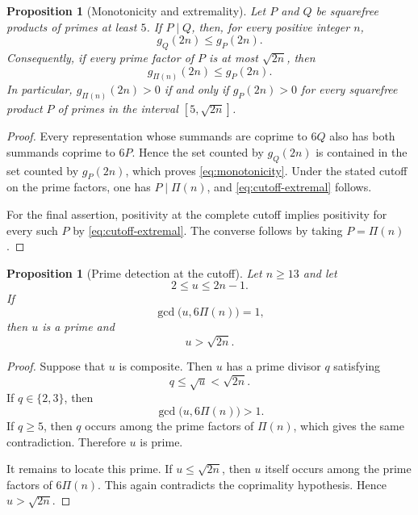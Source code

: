 \documentclass[12pt]{article}
\numberwithin{equation}{section}
\newtheorem{proposition}[theorem]{Proposition}
\theoremstyle{definition}
\theoremstyle{remark}
\begin{document}
\begin{proposition}[Monotonicity and extremality]
\label{prop:cutoff-monotonicity}
Let $P$ and $Q$ be squarefree products of primes at least $5$.
If $P\mid Q$, then, for every positive integer $n$,
\begin{equation}
\label{eq:monotonicity}
g_Q(2n)\leq g_P(2n).
\end{equation}
Consequently, if every prime factor of $P$ is at most
$\sqrt{2n}$, then
\begin{equation}
\label{eq:cutoff-extremal}
g_{\Pi(n)}(2n)\leq g_P(2n).
\end{equation}
In particular, $g_{\Pi(n)}(2n)>0$ if and only if
$g_P(2n)>0$ for every squarefree product $P$ of primes in the
interval $[5,\sqrt{2n}]$.
\end{proposition}

\begin{proof}
Every representation whose summands are coprime to $6Q$ also
has both summands coprime to $6P$. Hence the set counted by
$g_Q(2n)$ is contained in the set counted by $g_P(2n)$, which
proves \eqref{eq:monotonicity}. Under the stated cutoff on the
prime factors, one has $P\mid\Pi(n)$, and
\eqref{eq:cutoff-extremal} follows.

For the final assertion, positivity at the complete cutoff
implies positivity for every such $P$ by
\eqref{eq:cutoff-extremal}. The converse follows by taking
$P=\Pi(n)$.
\end{proof}

\begin{proposition}[Prime detection at the cutoff]
\label{prop:cutoff-prime}
Let $n\geq13$ and let
\[
2\leq u\leq2n-1.
\]
If
\[
\gcd\bigl(u,6\Pi(n)\bigr)=1,
\]
then $u$ is a prime and
\[
u>\sqrt{2n}.
\]
\end{proposition}

\begin{proof}
Suppose that $u$ is composite. Then $u$ has a prime divisor $q$
satisfying
\[
q\leq\sqrt u<\sqrt{2n}.
\]
If $q\in\{2,3\}$, then
\[
\gcd\bigl(u,6\Pi(n)\bigr)>1.
\]
If $q\geq5$, then $q$ occurs among the prime factors of
$\Pi(n)$, which gives the same contradiction. Therefore $u$
is prime.

It remains to locate this prime. If $u\leq\sqrt{2n}$, then
$u$ itself occurs among the prime factors of $6\Pi(n)$. This
again contradicts the coprimality hypothesis. Hence
$u>\sqrt{2n}$.
\end{proof}
\end{document}
